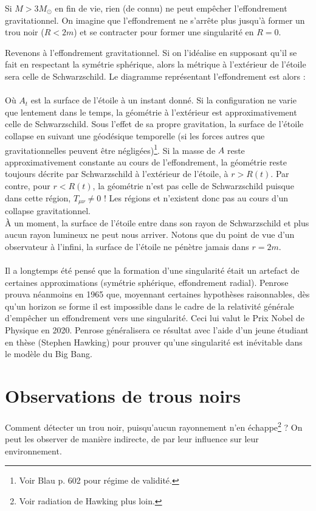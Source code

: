 \begin{rmk}
    Si $M > 3 M_\odot$ en fin de vie, rien (de connu) ne peut empêcher l'effondrement gravitationnel. On imagine que l'effondrement ne s'arrête plus jusqu'à former un trou noir ($R<2m$) et se contracter pour former une singularité en $R=0$.
\end{rmk}
Revenons à l'effondrement gravitationnel. Si on l'idéalise en supposant qu'il se fait en respectant la symétrie sphérique, alors la métrique à l'extérieur de l'étoile sera celle de Schwarzschild. Le diagramme représentant l'effondrement est alors :\\
\\
Où $A_t$ est la surface de l'étoile à un instant donné. Si la configuration ne varie que lentement dans le temps, la géométrie à l'extérieur est approximativement celle de Schwarzschild. Sous l'effet de sa propre gravitation, la surface de l'étoile collapse en suivant une géodésique temporelle (si les forces autres que gravitationnelles peuvent être négligées)\footnote{Voir Blau p. 602 pour régime de validité.}. Si la masse de $A$ reste approximativement constante au cours de l'effondrement, la géométrie reste toujours décrite par Schwarzschild à l'extérieur de l'étoile, à $r> R(t)$. Par contre, pour $r<R(t)$, la géométrie n'est pas celle de Schwarzschild puisque dans cette région, $T_{\mu\nu} \neq 0$ ! Les régions  et  n'existent donc pas au cours d'un collapse gravitationnel. \\
À un moment, la surface de l'étoile entre dans son rayon de Schwarzschild et plus aucun rayon lumineux ne peut nous arriver. Notons que du point de vue d'un observateur à l'infini, la surface de l'étoile ne pénètre jamais dans $r=2m$.\\
\\
Il a longtemps été pensé que la formation d'une singularité était un artefact de certaines approximations (symétrie sphérique, effondrement radial). Penrose prouva néanmoins en 1965 que, moyennant certaines hypothèses raisonnables, dès qu'un horizon se forme il est impossible dans le cadre de la relativité générale d'empêcher un effondrement vers une singularité. Ceci lui valut le Prix Nobel de Physique en 2020. Penrose généralisera ce résultat avec l'aide d'un jeune étudiant en thèse (Stephen Hawking) pour prouver qu'une singularité est inévitable dans le modèle du Big Bang.
\section{Observations de trous noirs}
Comment détecter un trou noir, puisqu'aucun rayonnement n'en échappe\footnote{Voir radiation de Hawking plus loin.} ? On peut les observer de manière indirecte, de par leur influence sur leur environnement.
